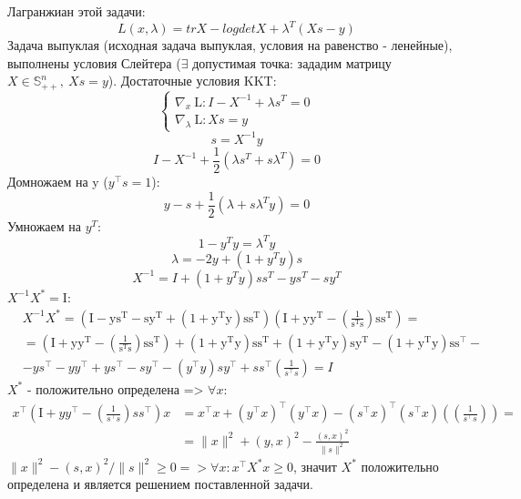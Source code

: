 \documentclass[12pt,letterpaper]{article}
\begin{document}
Лагранжиан этой задачи:
$$L(x,\lambda)=trX-logdetX +{\lambda}^T(Xs-y)$$
Задача выпуклая (исходная задача выпуклая, условия на равенство - ленейные), выполнены условия Слейтера ($\exists$ допустимая точка: зададим матрицу $ X \in \mathbb{S}_{++}^{n},\ Xs=y$).
Достаточные условия KKT:
$$\left\{\begin{array}{l}
\nabla_{x} \mathrm{~L}: I-X^{-1}+\lambda s^T=0\\
\nabla_{\lambda} \mathrm{~L}: Xs=y
\end{array}\right.$$
$$s=X^{-1}y$$
$$I-X^{-1}+\frac{1}{2}\left(\lambda s^{T}+s \lambda^{T}\right)=0$$
Домножаем на y (\(y^\top s = 1\)):
$$y-s+\frac{1}{2}\left(\lambda+s \lambda^{T} y\right)=0$$
Умножаем на $y^T$:
$$1 - y^Ty = {\lambda}^Ty$$
$$\lambda=-2 y+\left(1+y^{T} y\right) s$$
$$X^{-1}=I+\left(1+y^{T} y\right) s s^{T}-y s^{T}-s y^{T}$$
$ X^{-1} X^* = \mathrm{I} $:
$$\begin{aligned}
&X^{-1} X^* = \left(\mathrm{I}-\mathrm{ys}^{\mathrm{T}}-\mathrm{s} \mathrm{y}^{\mathrm{T}}+\left(1+\mathrm{y}^{\mathrm{T}} \mathrm{y}\right) \mathrm{ss}^{\mathrm{T}}\right)\left(\mathrm{I}+\mathrm{y} \mathrm{y}^{\mathrm{T}}-\left(\frac{1}{\mathrm{s}^{\mathrm{T}} \mathrm{s}} \right) \mathrm{ss}^{\mathrm{T}}\right)= \\
&=\left(\mathrm{I}+\mathrm{y} \mathrm{y}^{\mathrm{T}}-\left(\frac{1}{\mathrm{s}^{\mathrm{T}} \mathrm{s}}\right) \mathrm{ss}^{\mathrm{T}}\right)+\left(1+\mathrm{y}^{\mathrm{T}} \mathrm{y}\right) \mathrm{ss}^{\mathrm{T}}+\left(1+\mathrm{y}^{\mathrm{T}} \mathrm{y}\right) \mathrm{s} \mathrm{y}^{\mathrm{T}}-\left(1+\mathrm{y}^{\mathrm{T}} \mathrm{y}\right) \mathrm{ss}^{\top} - \\
&-y s^{\top}-y y^{\top}+y s^{\top}-s y^{\top}-\left(y^{\top} y\right) s y^{\top}+s s^{\top}\left(\frac{1}{s^{\top} s}  \right)=I
\end{aligned} $$
$ X^* $ - положительно определена => $\forall x:$
$$\begin{aligned}
x^{\top}\left(\mathrm{I}+y y^{\top}-\left(\frac{1}{s^{\top} s} \right) s s^{\top}\right) x &=x^{\top} x+\left(y^{\top} x\right)^{\top}\left(y^{\top} x\right)-\left(s^{\top} x\right)^{\top}\left(s^{\top} x\right)\left(\left(\frac{1}{s^{\top} s}\right)\right)=\\
&=\|x\|^{2}+(y, x)^{2}-\frac{(s, x)^{2}}{\|s\|^{2}} 
\end{aligned} $$
$ \|x\|^{2} - (s, x)^{2} /\|s\|^{2} \geq 0 => \forall x : x^{\top}X^* x \geq 0 $, значит $ X^* $ положительно определена и является решением поставленной задачи.
\end{document}
